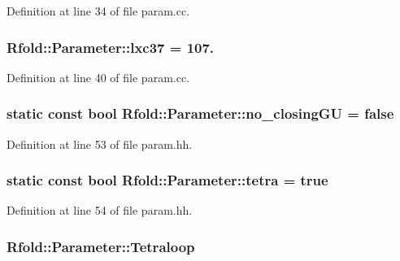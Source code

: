 Definition at line 34 of file param.\+cc.

\hypertarget{namespace_rfold_1_1_parameter_a342cc90fdcdcc468a3c7f0817dd5e78d}{
\subsubsection[{lxc37}]{ Rfold\+::\+Parameter\+::lxc37 = 107.}}\label{namespace_rfold_1_1_parameter_a342cc90fdcdcc468a3c7f0817dd5e78d}


Definition at line 40 of file param.\+cc.

\hypertarget{namespace_rfold_1_1_parameter_a312a98d9462d203bcef26ce195b94bca}{
\subsubsection[{no\+\_\+closing\+G\+U}]{\setlength{\rightskip}{0pt plus 5cm}static const bool Rfold\+::\+Parameter\+::no\+\_\+closing\+G\+U = false}}\label{namespace_rfold_1_1_parameter_a312a98d9462d203bcef26ce195b94bca}


Definition at line 53 of file param.\+hh.

\hypertarget{namespace_rfold_1_1_parameter_a38a90dcb0eaf3b35fbed6230d5f8a389}{
\subsubsection[{tetra}]{\setlength{\rightskip}{0pt plus 5cm}static const bool Rfold\+::\+Parameter\+::tetra = true}}\label{namespace_rfold_1_1_parameter_a38a90dcb0eaf3b35fbed6230d5f8a389}


Definition at line 54 of file param.\+hh.

\hypertarget{namespace_rfold_1_1_parameter_a5ebb2605e5088c56cd2a015f2ea1f487}{
\subsubsection[{Tetraloop}]{ Rfold\+::\+Parameter\+::\+Tetraloop}}\label{namespace_rfold_1_1_parameter_a5ebb2605e5088c56cd2a015f2ea1f487}


